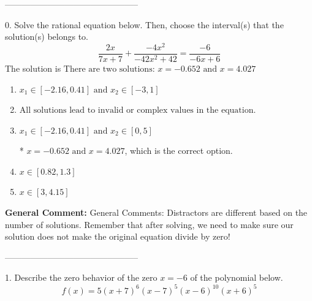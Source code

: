 \documentclass{extbook}[14pt]
\begin{document}
-----------------------------------------------

0. Solve the rational equation below. Then, choose the interval(s) that the solution(s) belongs to.
\[ \frac{2x}{7x + 7} + \frac{-4x^{2}}{-42x^{2} + 42} = \frac{-6}{-6x + 6} \] 
The solution is $ \text{There are two solutions: } x = -0.652 \text{ and } x = 4.027 $ 

\begin{enumerate}[label=\Alph*.] 
\item $ x_1 \in [-2.16, 0.41] \text{ and } x_2 \in [-3,1] $ 

  
\item $ \text{All solutions lead to invalid or complex values in the equation.} $ 

  
\item $ x_1 \in [-2.16, 0.41] \text{ and } x_2 \in [0,5] $ 

 * $x = -0.652 \text{ and } x = 4.027$, which is the correct option. 
\item $ x \in [0.82,1.3] $ 

  
\item $ x \in [3,4.15] $ 

  
\end{enumerate} 
 
\textbf{General Comment:} General Comments: Distractors are different based on the number of solutions. Remember that after solving, we need to make sure our solution does not make the original equation divide by zero! 

-----------------------------------------------

1. Describe the zero behavior of the zero $x = -6$ of the polynomial below.
\[ f(x) = 5(x + 7)^{6}(x - 7)^{5}(x - 6)^{10}(x + 6)^{5} \] 
\end{document}
